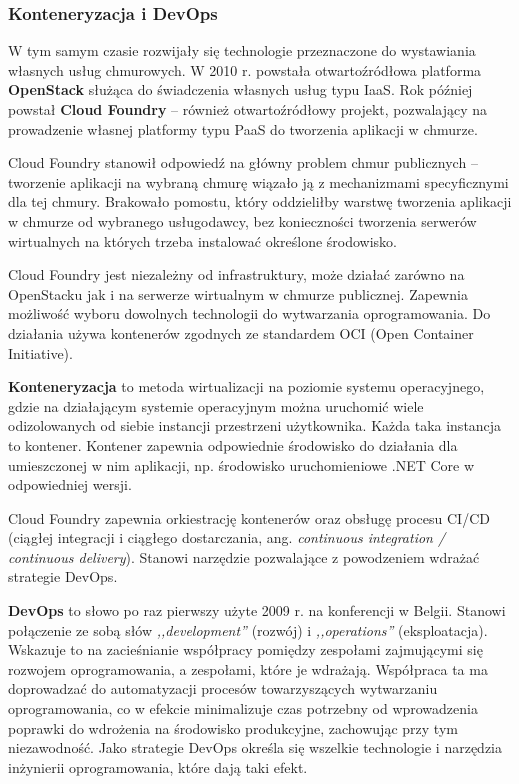 \documentclass[12pt,a4paper,twoside,titlepage,openright]{book}
\begin{document}
\subsubsection{Konteneryzacja i DevOps}

W tym samym czasie rozwijały się technologie przeznaczone do wystawiania własnych usług chmurowych. W 2010 r. powstała otwartoźródłowa platforma \textbf{OpenStack} służąca do świadczenia własnych usług typu IaaS. Rok później powstał \textbf{Cloud Foundry} -- również otwartoźródłowy projekt, pozwalający na prowadzenie własnej platformy typu PaaS do tworzenia aplikacji w chmurze. 

Cloud Foundry stanowił odpowiedź na główny problem chmur publicznych -- tworzenie aplikacji na wybraną chmurę wiązało ją z mechanizmami specyficznymi dla tej chmury. Brakowało pomostu, który oddzieliłby warstwę tworzenia aplikacji w chmurze od wybranego usługodawcy, bez konieczności tworzenia serwerów wirtualnych na których trzeba instalować określone środowisko. \cite{cloudFoundry}

Cloud Foundry jest niezależny od infrastruktury, może działać zarówno na OpenStacku jak i na serwerze wirtualnym w chmurze publicznej. Zapewnia możliwość wyboru dowolnych technologii do wytwarzania oprogramowania. Do działania używa kontenerów zgodnych ze standardem OCI (Open Container Initiative). \cite{cloudFoundry} 

\textbf{Konteneryzacja} to metoda wirtualizacji na poziomie systemu operacyjnego, gdzie na działającym systemie operacyjnym można uruchomić wiele odizolowanych od siebie instancji przestrzeni użytkownika. Każda taka instancja to kontener. Kontener zapewnia odpowiednie środowisko do działania dla umieszczonej w nim aplikacji, np. środowisko uruchomieniowe .NET Core w odpowiedniej wersji.  \cite{cloudFoundry,ccSpringer}

Cloud Foundry zapewnia orkiestrację kontenerów oraz obsługę procesu CI/CD (ciągłej integracji i ciągłego dostarczania, ang. \textit{continuous integration / continuous delivery}).\cite{cloudFoundry} Stanowi narzędzie pozwalające z powodzeniem wdrażać strategie DevOps. 

\textbf{DevOps} to słowo po raz pierwszy użyte 2009 r. na konferencji w Belgii. Stanowi połączenie ze sobą słów \textit{,,development''} (rozwój) i \textit{,,operations''} (eksploatacja). Wskazuje to na zacieśnianie współpracy pomiędzy zespołami zajmującymi się rozwojem oprogramowania, a zespołami, które je wdrażają. Współpraca ta ma doprowadzać do automatyzacji procesów towarzyszących wytwarzaniu oprogramowania, co w efekcie minimalizuje czas potrzebny od wprowadzenia poprawki do wdrożenia na środowisko produkcyjne, zachowując przy tym niezawodność. Jako strategie DevOps określa się wszelkie technologie i narzędzia inżynierii oprogramowania, które dają taki efekt. \cite{devOpsPackt}
\end{document}
